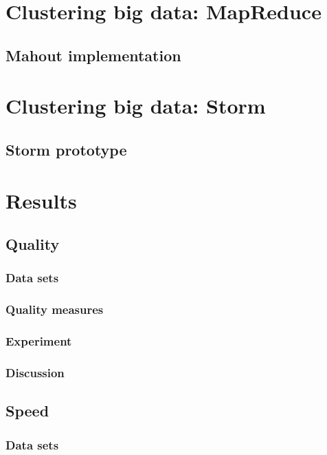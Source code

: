 \documentclass{article}
\begin{document}
\section{Clustering big data: MapReduce}

\subsection{Mahout implementation}

\section{Clustering big data: Storm}

\subsection{Storm prototype}

\section{Results}

\subsection{Quality}

\subsubsection{Data sets}

\subsubsection{Quality measures}

\subsubsection{Experiment}

\subsubsection{Discussion}

\subsection{Speed}

\subsubsection{Data sets}
\end{document}
